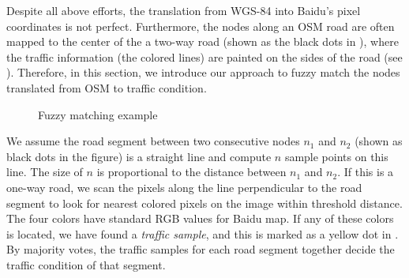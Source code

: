 
Despite all above efforts, the translation
from WGS-84 into Baidu's pixel coordinates is not perfect. 
Furthermore, the nodes along an OSM road are often mapped to the
center of the a two-way road (shown as the black dots in
), where the traffic information (the colored lines) are painted on the sides of the road
(see ).
Therefore, in this section, we introduce our approach to fuzzy match
the nodes translated from OSM to traffic condition.
\begin{figure}[th]
	\centering
	\caption{Fuzzy matching example}
	\label{fig:range}
\end{figure}

We assume the road segment between two consecutive nodes $n_1$ and $n_2$ 
(shown as black dots in the figure)
is a straight line and compute $n$ sample points on this line. 
The size of $n$ is proportional to the distance between  $n_1$ and
$n_2$. If this is a one-way road, we scan the pixels along the line
perpendicular to the road segment to look for nearest colored pixels
on the image within threshold distance. The four colors have standard
RGB values for Baidu map. If any of these colors is located, we have
found a {\em traffic sample}, and this is marked as a yellow dot
in . By majority votes, the traffic samples for 
each road segment together decide the traffic condition of that segment.


